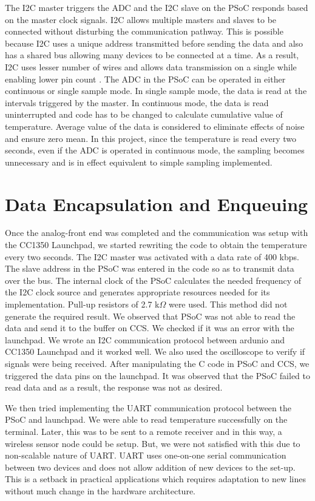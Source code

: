 \documentclass[conference]{IEEEtran}
\begin{document}
The I2C master triggers the ADC and the I2C slave on the PSoC responds based on the master clock signals. I2C allows multiple masters and slaves to be connected without disturbing the communication pathway. This is possible because I2C uses a unique address transmitted before sending the data and also has a shared bus allowing many devices to be connected at a time. As a result, I2C uses lesser number of wires and allows data transmission on a single while enabling lower pin count \cite{b3}. The ADC in the PSoC can be operated in either continuous or single sample mode. In single sample mode, the data is read at the intervals triggered by the master. In continuous mode, the data is read uninterrupted and code has to be changed to calculate cumulative value of temperature. Average value of the data is considered to eliminate effects of noise and ensure zero mean. In this project, since the temperature is read every two seconds, even if the ADC is operated in continuous mode, the sampling becomes unnecessary and is in effect equivalent to simple sampling implemented. 

 
\section{Data Encapsulation and Enqueuing }

Once the analog-front end was completed and the communication was setup with the CC1350 Launchpad, we started rewriting the code to obtain the temperature every two seconds. The I2C master was activated with a data rate of 400 kbps. The slave address in the PSoC was entered in the code so as to transmit data over the bus. The internal clock of the PSoC calculates the needed frequency of the I2C clock source and generates appropriate resources needed for its implementation. Pull-up resistors of 2.7 k$\Omega$ were used. This method did not generate the required result. We observed that PSoC was not able to read the data and send it to the buffer on CCS. We checked if it was an error with the launchpad. We wrote an I2C communication protocol between ardunio and CC1350 Launchpad and it worked well. We also used the oscilloscope to verify if signals were being received. After manipulating the C code in PSoC and CCS, we triggered the data pins on the launchpad. It was observed that the PSoC failed to read data and as a result, the response was not as desired.  %

We then tried implementing the UART communication protocol between the PSoC and launchpad. We were able to read temperature successfully on the terminal. Later, this was to be sent to a remote receiver and in this way, a wireless sensor node could be setup. But, we were not satisfied with this due to non-scalable nature of UART. UART uses one-on-one serial communication between two devices and does not allow addition of new devices to the set-up. This is a setback in practical applications which requires adaptation to new lines without much change in the hardware architecture.
\end{document}
